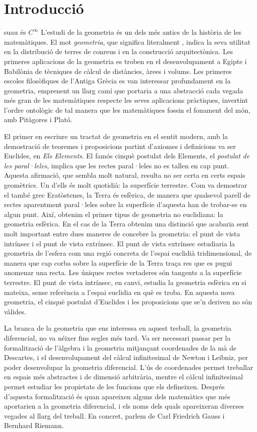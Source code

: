 \chapter{Introducci\'o}
{\color{red} suau és $C^\infty$}
L'estudi de la geometria és un dels més antics de la història de les matemàtiques. El mot \textit{geometria}, que significa literalment , indica la seva utilitat en la distribució de terres de conreus i en la construcció arquitectònica. Les primeres aplicacions de la geometria es troben en el desenvolupament a Egipte i Babilònia de tècniques de càlcul de distàncies, àrees i volums. Les primeres escoles filosòfiques de l'Antiga Grècia es van interessar profundament en la geometria, emprenent un llarg camí que portaria a una abstracció cada vegada més gran de les matemàtiques respecte les seves aplicacions pràctiques, invertint l'ordre ontològic de tal manera que les matemàtiques fossin el fonament del món, amb Pitàgores i Plató.

El primer en escriure un tractat de geometria en el sentit modern, amb la demostració de teoremes i proposicions partint d'axiomes i definicions va ser Euclides, en \textit{Els Elements}. El famós cinquè postulat dels Elements, el \textit{postulat de les paral·leles}, implica que les rectes paral·leles no es tallen en cap punt. Aquesta afirmació, que sembla molt natural, resulta no ser certa en certs espais geomètrics. Un d'ells és molt quotidià: la superfície terrestre. Com va demostrar el també grec Eratòstenes, la Terra és esfèrica, de manera que qualsevol parell de rectes aparentment paral·leles sobre la superfície d'aquesta han de trobar-se en algun punt. Així, obtenim el primer tipus de geometria no euclidiana: la geometria esfèrica. En el cas de la Terra obtenim una distinció que acabaria sent molt important entre dues maneres de concebre la geometria: el punt de vista intrínsec i el punt de vista extrínsec. El punt de vista extrínsec estudiaria la geometria de l'esfera com una regió concreta de l'espai euclidià tridimensional, de manera que cap corba sobre la superfície de la Terra traça res que es pugui anomenar una recta. Les úniques rectes vertaderes són tangents a la superfície terrestre. El punt de vista intrínsec, en canvi, estudia la geometria esfèrica en si mateixa, sense referència a l'espai euclidia en què es troba. En aquesta nova geometria, el cinquè postulat d'Euclides i les proposicions que se'n deriven no són vàlides.

La branca de la geometria que ens interessa en aquest treball, la geometria diferencial, no va néixer fins segles més tard. Va ser necessari passar per la formalització de l'àlgebra i la geometria mitjançant coordenades de la mà de Descartes, i el desenvolupament del càlcul infinitesimal de Newton i Leibniz, per poder desenvolupar la geometria diferencial. L'ús de coordenades permet treballar en espais més abstractes i de dimensió arbitrària, mentre el càlcul infinitesimal permet estudiar les propietats de les funcions que els defineixen. Després d'aquesta formalització és quan apareixen alguns dels matemàtics que més aportarien a la geometria diferencial, i els noms dels quals apareixeran diverses vegades al llarg del treball. En concret, parlem de Carl Friedrich Gauss i Bernhard Riemann.

